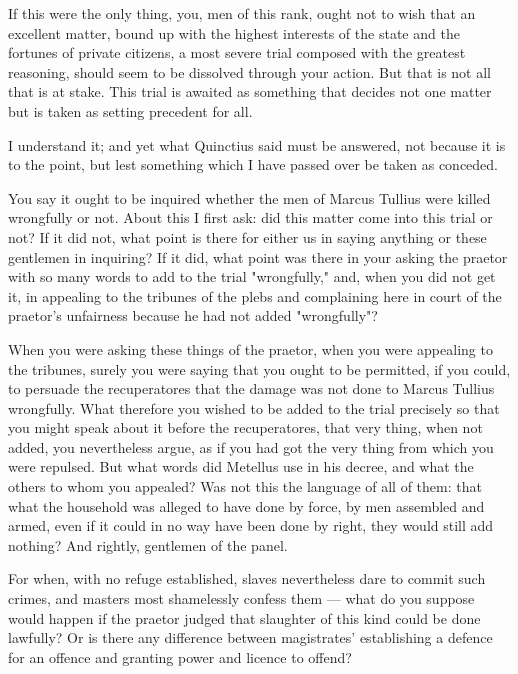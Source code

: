  If this were the only thing, you, men of this rank, ought not to wish that an excellent matter, bound up with the highest interests of the state and the fortunes of private citizens, a most severe trial composed with the greatest reasoning, should seem to be dissolved through your action. But that is not all that is at stake. This trial is awaited as something that decides not one matter but is taken as setting precedent for all.

 I understand it; and yet what Quinctius said must be answered, not because it is to the point, but lest something which I have passed over be taken as conceded.

 You say it ought to be inquired whether the men of Marcus Tullius were killed wrongfully or not. About this I first ask: did this matter come into this trial or not? If it did not, what point is there for either us in saying anything or these gentlemen in inquiring? If it did, what point was there in your asking the praetor with so many words to add to the trial "wrongfully," and, when you did not get it, in appealing to the tribunes of the plebs and complaining here in court of the praetor's unfairness because he had not added "wrongfully"?

 When you were asking these things of the praetor, when you were appealing to the tribunes, surely you were saying that you ought to be permitted, if you could, to persuade the recuperatores that the damage was not done to Marcus Tullius wrongfully. What therefore you wished to be added to the trial precisely so that you might speak about it before the recuperatores, that very thing, when not added, you nevertheless argue, as if you had got the very thing from which you were repulsed. But what words did Metellus use in his decree, and what the others to whom you appealed? Was not this the language of all of them: that what the household was alleged to have done by force, by men assembled and armed, even if it could in no way have been done by right, they would still add nothing? And rightly, gentlemen of the panel.

 For when, with no refuge established, slaves nevertheless dare to commit such crimes, and masters most shamelessly confess them --- what do you suppose would happen if the praetor judged that slaughter of this kind could be done lawfully? Or is there any difference between magistrates' establishing a defence for an offence and granting power and licence to offend?

